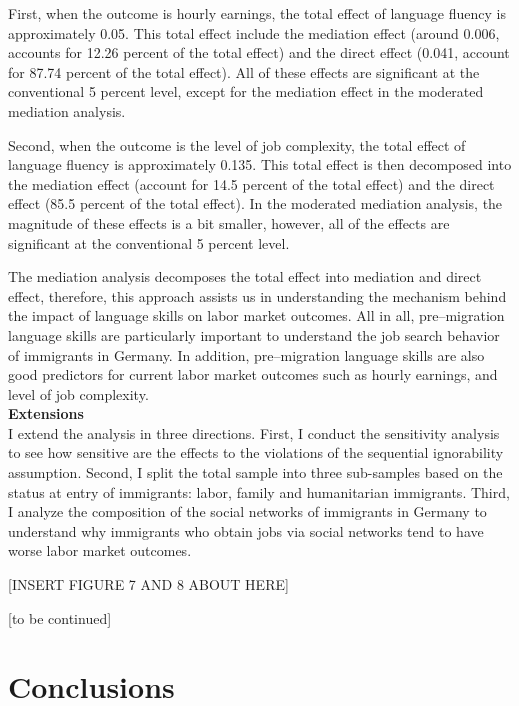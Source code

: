 \documentclass[12pt,a4paper]{article}
\begin{document}
First, when the outcome is hourly earnings, the total effect of language fluency is approximately 0.05. This total effect include the mediation effect (around 0.006, accounts for 12.26 percent of the total effect) and the direct effect (0.041, account for 87.74 percent of the total effect). All of these effects are significant at the conventional 5 percent level, except for the mediation effect in the moderated mediation analysis.

Second, when the outcome is the level of job complexity, the total effect of language fluency is approximately 0.135. This total effect is then decomposed into the mediation effect (account for 14.5 percent of the total effect) and the direct effect (85.5 percent of the total effect). In the moderated mediation analysis, the magnitude of these effects is a bit smaller, however, all of the effects are significant at the conventional 5 percent level.

The mediation analysis decomposes the total effect into mediation and direct effect, therefore, this approach assists us in understanding the mechanism behind the impact of language skills on labor market outcomes. All in all, pre--migration language skills are particularly important to understand the job search behavior of immigrants in Germany. In addition, pre--migration language skills are also good predictors for current labor market outcomes such as hourly earnings, and level of job complexity. \\

\textbf{Extensions}\\

I extend the analysis in three directions. First, I conduct the sensitivity analysis to see how sensitive are the effects to the violations of the sequential ignorability assumption. Second, I split the total sample into three sub-samples based on the status at entry of immigrants: labor, family and humanitarian immigrants. Third, I analyze the composition of the social networks of immigrants in Germany to understand why immigrants who obtain jobs via social networks tend to have worse labor market outcomes.

\begin{center}
[INSERT FIGURE 7 AND 8 ABOUT HERE]

[to be continued]
\end{center} 

\section{Conclusions}
\end{document}
